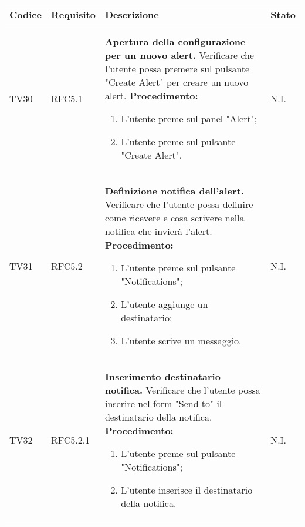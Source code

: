 \begin{table}[!htpb]
	\centering
	\renewcommand{\arraystretch}{2} 
	\begin{tabular}{|l|l|p{10cm}|l|}
		\rowcolor{orange!50}
		\hline
		\textbf{Codice} & \textbf{Requisito}& \textbf{Descrizione} & \textbf{Stato}\\ 
		\hline
		TV30 & RFC5.1 &
			\textbf{Apertura della configurazione per un nuovo alert.}
			\newline
			Verificare che l'utente possa premere sul pulsante "Create Alert" per creare un nuovo alert.
			\newline
			\textbf{Procedimento:}
			\begin{enumerate}
				\item L'utente preme sul panel "Alert"; 
				\item L’utente preme sul pulsante "Create Alert".
			\end{enumerate} 
			& N.I.\\
		\hline
		TV31 & RFC5.2 &
			\textbf{Definizione notifica dell'alert.} 
			\newline
			Verificare che l’utente possa definire come ricevere e cosa scrivere nella notifica che invierà l'alert. 
			\newline 
			\textbf{Procedimento:} 
			\begin{enumerate} 
				\item L'utente preme sul pulsante "Notifications"; 
				\item L'utente aggiunge un destinatario; 
				\item L'utente scrive un messaggio.		
			\end{enumerate} 
			& N.I.\\
		\hline
		TV32 & RFC5.2.1 &
			\textbf{Inserimento destinatario notifica.}
			\newline
			Verificare che l'utente possa inserire nel form "Send to" il destinatario della notifica.
			\newline
			\textbf{Procedimento:}
			\begin{enumerate}
				\item L'utente preme sul pulsante "Notifications"; 
				\item L’utente inserisce il destinatario della notifica.
			\end{enumerate} 
			& N.I.\\
		\hline
	\end{tabular}
\end{table}
